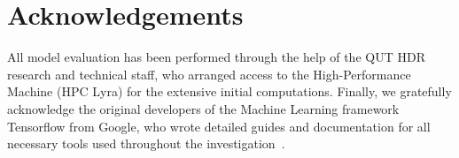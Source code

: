 \section{Acknowledgements}\label{sec:acknowledgements}
All model evaluation has been performed through the help of the QUT HDR research and technical staff, who arranged access to the High-Performance Machine (HPC Lyra) for the extensive initial computations.
Finally, we gratefully acknowledge the original developers of the Machine Learning framework Tensorflow from Google, who wrote detailed guides and documentation for all necessary tools used throughout the investigation~\cite{tensorflow2015-whitepaper}.
